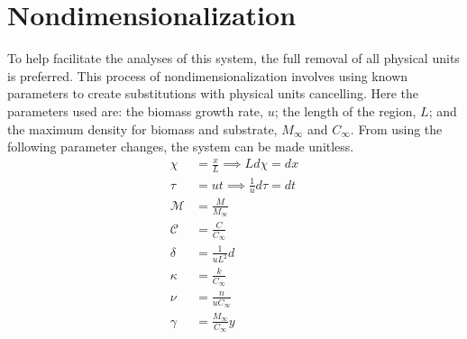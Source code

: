 \section{Nondimensionalization}
 
To help facilitate the analyses of this system, the full removal of all physical units is preferred. 
This process of nondimensionalization involves using known parameters to create substitutions with physical units cancelling.
Here the parameters used are: the biomass growth rate, $u$; the length of the region, $L$; and the maximum density for biomass and substrate, $M_\infty$ and $C_\infty$.
From using the following parameter changes, the system can be made unitless.
\begin{align}
  \chi &= \frac{x}{L} \implies L d\chi= dx \\
  \tau &= u t \implies \frac{1}{u} d\tau= dt \\
  \mathcal{M} &= \frac{M}{M_{\infty}} \\
  \mathcal{C} &= \frac{C}{C_{\infty}} \\
  \delta &= \frac{1}{u L^2} d \\
  \kappa &= \frac{k}{C_\infty} \\
  \nu &= \frac{n}{u C_\infty} \\
  \gamma &= \frac{M_\infty}{C_\infty} y
\end{align}

